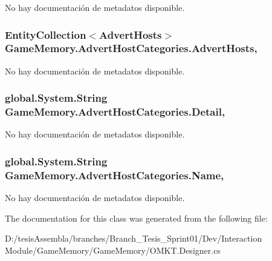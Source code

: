 No hay documentación de metadatos disponible. 

\hypertarget{class_game_memory_1_1_advert_host_categories_a3d8f8d6f01ed2c43921957b1de473fe8}{
\subsubsection[{Advert\-Hosts}]{\setlength{\rightskip}{0pt plus 5cm}Entity\-Collection$<${\bf Advert\-Hosts}$>$ Game\-Memory.\-Advert\-Host\-Categories.\-Advert\-Hosts\hspace{0.3cm}{\ttfamily [get]}, {\ttfamily [set]}}}\label{class_game_memory_1_1_advert_host_categories_a3d8f8d6f01ed2c43921957b1de473fe8}


No hay documentación de metadatos disponible. 

\hypertarget{class_game_memory_1_1_advert_host_categories_a192d719edeeeb2188e5f05b036b56de6}{
\subsubsection[{Detail}]{\setlength{\rightskip}{0pt plus 5cm}global.\-System.\-String Game\-Memory.\-Advert\-Host\-Categories.\-Detail\hspace{0.3cm}{\ttfamily [get]}, {\ttfamily [set]}}}\label{class_game_memory_1_1_advert_host_categories_a192d719edeeeb2188e5f05b036b56de6}


No hay documentación de metadatos disponible. 

\hypertarget{class_game_memory_1_1_advert_host_categories_a27c87fd89b900401aa077659f344f87f}{
\subsubsection[{Name}]{\setlength{\rightskip}{0pt plus 5cm}global.\-System.\-String Game\-Memory.\-Advert\-Host\-Categories.\-Name\hspace{0.3cm}{\ttfamily [get]}, {\ttfamily [set]}}}\label{class_game_memory_1_1_advert_host_categories_a27c87fd89b900401aa077659f344f87f}


No hay documentación de metadatos disponible. 



The documentation for this class was generated from the following file\-:\begin{DoxyCompactItemize}
\item 
D\-:/tesis\-Assembla/branches/\-Branch\-\_\-\-Tesis\-\_\-\-Sprint01/\-Dev/\-Interaction Module/\-Game\-Memory/\-Game\-Memory/O\-M\-K\-T.\-Designer.\-cs\end{DoxyCompactItemize}
